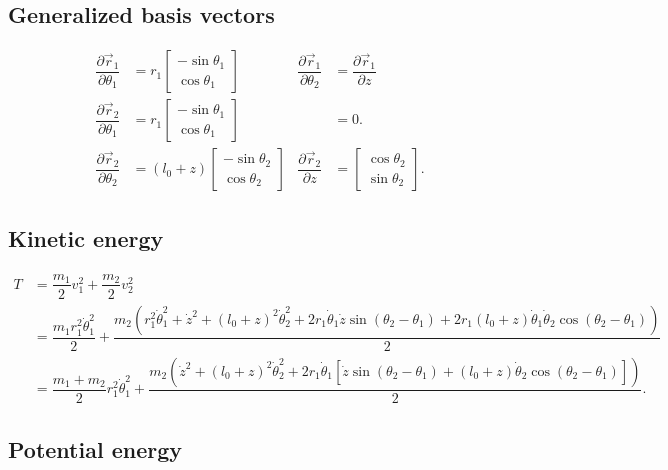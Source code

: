 \documentclass[12pt,a4paper,portrait]{article}
\begin{document}
\subsection{Generalized basis vectors}
\begin{align*}
	\dfrac{\partial \vec{r}_1}{\partial \theta_1} &= r_1\begin{bmatrix}
		-\sin{\theta_1} \\
		\cos{\theta_1}
	\end{bmatrix} & \dfrac{\partial \vec{r}_1}{\partial \theta_2} &= \dfrac{\partial \vec{r}_1}{\partial z} \\
	\dfrac{\partial \vec{r}_2}{\partial \theta_1} &= r_1\begin{bmatrix}
		-\sin{\theta_1} \\
		\cos{\theta_1}
	\end{bmatrix} & &= 0. \\
	\dfrac{\partial \vec{r}_2}{\partial \theta_2} &= (l_0+z)\begin{bmatrix}
		-\sin{\theta_2} \\
		\cos{\theta_2}
	\end{bmatrix} & \dfrac{\partial \vec{r}_2}{\partial z} &= \begin{bmatrix}
		\cos{\theta_2}\\
		\sin{\theta_2}
	\end{bmatrix}.
\end{align*}

\subsection{Kinetic energy}
\begin{align*}
	T &= \dfrac{m_1}{2}v_1^2 + \dfrac{m_2}{2}v_2^2 \\
	&= \dfrac{m_1r_1^2 \dot{\theta}_1^2}{2} + \dfrac{m_2(r_1^2 \dot{\theta}_1^2 + \dot{z}^2 + (l_0+z)^2\dot{\theta}_2^2 + 2r_1\dot{\theta}_1 \dot{z} \sin{(\theta_2-\theta_1)} + 2r_1(l_0+z)\dot{\theta}_1\dot{\theta}_2\cos{(\theta_2 - \theta_1)})}{2}\\
	&= \dfrac{m_1+m_2}{2}r_1^2\dot{\theta}_1^2 + \dfrac{m_2(\dot{z}^2 + (l_0+z)^2\dot{\theta}_2^2 + 2r_1\dot{\theta}_1[ \dot{z} \sin{(\theta_2-\theta_1)} + (l_0+z)\dot{\theta}_2\cos{(\theta_2 - \theta_1)}])}{2}.
\end{align*}

\subsection{Potential energy}
\end{document}
